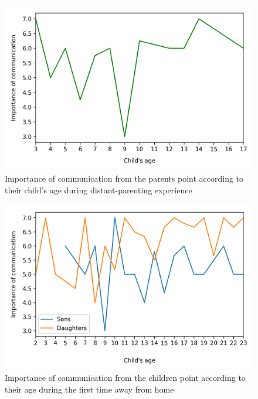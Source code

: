 \begin{figure}[h]
    \centering
    \caption{Importance of communication from the parents point according to their child's age during distant-parenting experience}
    \label{fig:plot_1}
    \includegraphics[scale=0.58]{plots/plot_1.png}
\end{figure}

\begin{figure}[h]
    \centering
    \caption{Importance of communication from the children point according to their age during the first time away from home}
    \label{fig:plot_2}
    \includegraphics[scale=0.58]{plots/plot_2.png}
\end{figure}

